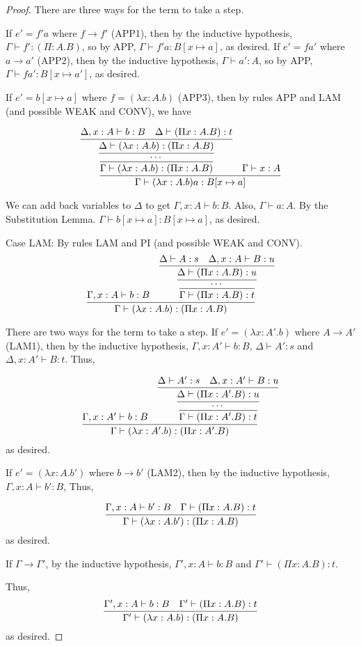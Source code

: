 \documentclass{article}
\begin{document}
\begin{proof}
  There are three ways for the term to take a step.

  If $e'=f' a$ where $f\rightarrow f'$ (APP1), then by the inductive hypothesis, $\Gamma\vdash f':(\Pi:A.B)$, so by APP, $\Gamma\vdash f' a:B[x\mapsto a]$, as desired.
  If $e'=f a'$ where $a\rightarrow a'$ (APP2), then by the inductive hypothesis, $\Gamma\vdash a':A$, so by APP, $\Gamma\vdash f a':B[x\mapsto a']$, as desired.

  If $e'=b[x\mapsto a]$ where $f=(\lambda x:A.b)$ (APP3), then by rules APP and LAM (and possible WEAK and CONV), we have

  \[\infer{\Gamma\vdash(\lambda x:A.b) a:B[x\mapsto a]}{\infer{\Gamma\vdash (\lambda x:A.b):(\Pi x:A.B)}{\infer{\cdots}{\infer{\Delta\vdash (\lambda x:A.b):(\Pi x:A.B)}{\Delta,x:A\vdash b:B & \Delta\vdash (\Pi x:A.B):t}}} & \Gamma\vdash x:A}\]

  We can add back variables to $\Delta$ to get $\Gamma, x:A\vdash b:B$. Also, $\Gamma\vdash a:A$. By the Substitution Lemma. $\Gamma\vdash b[x\mapsto a]:B[x\mapsto a]$, as desired.

  
  Case LAM: By rules LAM and PI (and possible WEAK and CONV).
  \[\infer{\Gamma\vdash(\lambda x:A.b):(\Pi x:A.B)}{\Gamma,x:A\vdash b:B & \infer{\Gamma\vdash (\Pi x:A.B):t}{\infer{\cdots}{\infer{\Delta\vdash (\Pi x:A.B):u}{\Delta\vdash A:s & \Delta,x:A\vdash B:u}}}}\]

  There are two ways for the term to take a step. If $e'=(\lambda x:A'.b)$ where $A\rightarrow A'$ (LAM1), then by the inductive hypothesis, $\Gamma,x:A'\vdash b:B$, $\Delta\vdash A':s$ and $\Delta,x:A'\vdash B:t$. Thus,
    
  \[\infer{\Gamma\vdash(\lambda x:A'.b):(\Pi x:A'.B)}{\Gamma,x:A'\vdash b:B & \infer{\Gamma\vdash (\Pi x:A'.B):t}{\infer{\cdots}{\infer{\Delta\vdash (\Pi x:A'.B):u}{\Delta\vdash A':s & \Delta,x:A'\vdash B:u}}}}\]
  as desired.

  If $e'=(\lambda x:A.b')$ where $b\rightarrow b'$ (LAM2), then by the inductive hypothesis, $\Gamma,x:A\vdash b':B$, Thus,
    
  \[\infer{\Gamma\vdash(\lambda x:A.b'):(\Pi x:A.B)}{\Gamma,x:A\vdash b':B & \Gamma\vdash (\Pi x:A.B):t}\]
    as desired.

    If $\Gamma\rightarrow\Gamma'$, by the inductive hypothesis, $\Gamma',x:A\vdash b:B$ and $\Gamma'\vdash (\Pi x:A.B):t$.

    Thus,
    \[\infer{\Gamma'\vdash(\lambda x:A.b):(\Pi x:A.B)}{\Gamma',x:A\vdash b:B & \Gamma'\vdash (\Pi x:A.B):t}\]
    as desired.


\end{proof}
\end{document}
